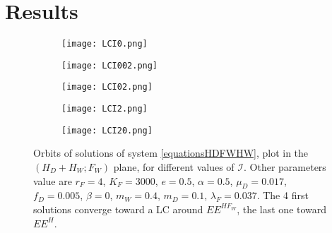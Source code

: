 \documentclass{article}
\newcommand{\lfw}{\lambda_{F}}
\newcommand{\lfw}{\lambda_{F}}
\newcommand{\cI}{\mathcal{I}}
\begin{document}
\section{Results}

\begin{figure}[!ht]
\centering
\begin{subfigure}{0.48\textwidth}
\centering
\texttt{[image: LCI0.png]}
\caption{}
\end{subfigure}
\begin{subfigure}{0.48\textwidth}
\centering
\texttt{[image: LCI002.png]}
\caption{}
\end{subfigure}
\hfill
\begin{subfigure}{0.49\textwidth}
\texttt{[image: LCI02.png]}
\caption{}
\end{subfigure}
\hfill
\begin{subfigure}{0.49\textwidth}
\texttt{[image: LCI2.png]}
\caption{}
\end{subfigure}
\begin{subfigure}{0.49\textwidth}
\texttt{[image: LCI20.png]}
\caption{}
\end{subfigure}
\caption{\centering Orbits of solutions of system \eqref{equationsHDFWHW}, plot in the $(H_D+H_W ; F_W)$ plane, for different values of $\cI$. Other parameters value are $r_F = 4$, $K_F=3000$, $e=0.5$, $\alpha = 0.5$, $\mu_D = 0.017$, $f_D = 0.005$, $\beta =0$, $m_W = 0.4$, $m_D = 0.1$, $\lfw = 0.037$. The 4 first solutions converge toward a LC around $EE^{HF_W}$, the last one toward $EE^{H}$.}
\end{figure}

\newpage



\end{document}

